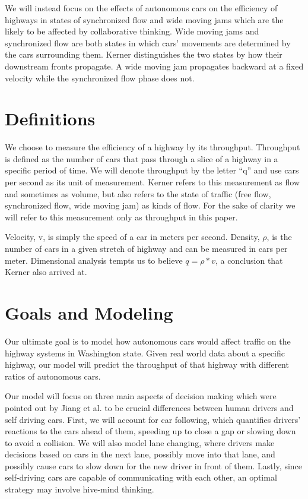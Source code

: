 We will instead focus on the effects of autonomous cars on the efficiency of highways in states of synchronized flow and wide moving jams which are the likely to be affected by collaborative thinking. Wide moving jams and synchronized flow are both states in which cars’ movements are determined by the cars surrounding them. Kerner distinguishes the two states by how their downstream fronts propagate. A wide moving jam propagates backward at a fixed velocity while the synchronized flow phase does not.

\section{Definitions}
We choose to measure the efficiency of a highway by its throughput. Throughput is defined as the number of cars that pass through a slice of a highway in a specific period of time. We will denote throughput by the letter “q” and use cars per second as its unit of measurement. Kerner refers to this measurement as flow and sometimes as volume, but also refers to the state of traffic (free flow, synchronized flow, wide moving jam) as kinds of flow. For the sake of clarity we will refer to this measurement only as throughput in this paper.

Velocity, v, is simply the speed of a car in meters per second. Density, $\rho$, is the number of cars in a given stretch of highway and can be measured in cars per meter. Dimensional analysis tempts us to believe $q = \rho * v$, a conclusion that Kerner also arrived at.

\section{Goals and Modeling}

Our ultimate goal is to model how autonomous cars would affect traffic on the highway systems in Washington state. Given real world data about a specific highway, our model will predict the throughput of that highway with different ratios of autonomous cars.

Our model will focus on three main aspects of decision making which were pointed out by Jiang et al. to be crucial differences between human drivers and self driving cars. First, we will account for car following, which quantifies drivers’ reactions to the cars ahead of them, speeding up to close a gap or slowing down to avoid a collision. We will also model lane changing, where drivers make decisions based on cars in the next lane, possibly move into that lane, and possibly cause cars to slow down for the new driver in front of them. Lastly, since self-driving cars are capable of communicating with each other, an optimal strategy may involve hive-mind thinking.

